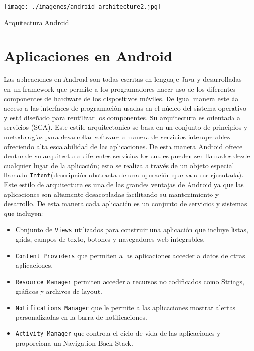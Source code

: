 \documentclass[letterpaper,12pt]{book}
\begin{document}
\begin{mainmatter}
\begin{center}
\texttt{[image: ./imagenes/android-architecture2.jpg]}
\end{center}
\begin{center}Arquitectura Android \cite{And}\end{center}





\section{Aplicaciones en Android}

Las aplicaciones en Android son todas escritas en lenguaje Java y
desarrolladas en un framework que permite a los programadores hacer
uso de los diferentes componentes de hardware de los dispositivos
móviles.  De igual manera este da acceso a las interfaces de
programación usadas en el núcleo del sistema operativo y está diseñado
para reutilizar los componentes.  Su arquitectura es orientada a
servicios (SOA). Este estílo arquitectonico se basa en un conjunto de
principios y metodologías para desarrollar software a manera de
servicios interoperables ofreciendo alta escalabilidad de las
aplicaciones. De esta manera Android ofrece dentro de su arquitectura
diferentes servicios los cuales pueden ser llamados desde cualquier
lugar de la aplicación; esto se realiza a través de un objeto especial
llamado \texttt{Intent}(descripción abstracta de una operación que va a ser
ejecutada).  Este estilo de arquitectura es una de las grandes
ventajas de Android ya que las aplicaciones son altamente desacopladas
facilitando su mantenimiento y desarrollo.  De esta manera cada
aplicación es un conjunto de servicios y sistemas que incluyen:

\begin{itemize}
\item Conjunto  de \texttt{Views} utilizados para construir  una aplicación que
  incluye listas,  grids, campos de  texto, botones y  navegadores web
  integrables.

\item  \texttt{Content Providers}  que permiten  a las  aplicaciones  acceder a
  datos de otras aplicaciones.
\item \texttt{Resource Manager} permiten acceder a recursos no codificados como
  Strings, gráficos y archivos de layout.
\item \texttt{Notifications Manager} que  le permite a las aplicaciones mostrar
  alertas personalizadas en la barra de notificaciones.
\item  \texttt{Activity  Manager}  que  controla   el  ciclo  de  vida  de  las
  aplicaciones y proporciona un Navigation Back Stack.


\end{itemize}
\end{mainmatter}
\end{document}
